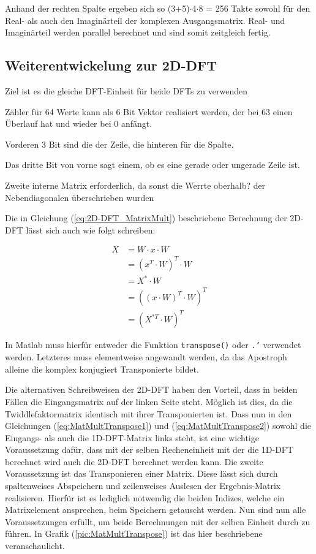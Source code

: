 Anhand der rechten Spalte ergeben sich so (3+5)$\cdot$4$\cdot$8 = 256 Takte sowohl für den Real- als auch den Imaginärteil der komplexen Ausgangsmatrix. Real- und Imaginärteil
werden parallel berechnet und sind somit zeitgleich fertig.


\subsection{Weiterentwickelung zur 2D-DFT}

Ziel ist es die gleiche DFT-Einheit für beide DFTs zu verwenden

Zähler für 64 Werte kann als 6 Bit Vektor realisiert werden, der bei 63 einen Überlauf hat und wieder bei 0 anfängt.

Vorderen 3 Bit sind die der Zeile, die hinteren für die Spalte.

Das dritte Bit von vorne sagt einem, ob es eine gerade oder ungerade Zeile ist.

Zweite interne Matrix erforderlich, da sonst die Werrte oberhalb? der
Nebendiagonalen  überschrieben wurden
 
 
 
Die in Gleichung (\ref{eq:2D-DFT_MatrixMult}) beschriebene Berechnung der 2D-DFT lässt sich auch wie folgt schreiben:

\begin{align}
 X &= W \cdot x \cdot W \nonumber \\
   &= \left(x^T\cdot W\right)^T\cdot W \label{eq:MatMultTranspose1} \\
   &= X^* \cdot W \nonumber\\
   &= \left(\left(x\cdot W\right)^T\cdot W\right)^T \label{eq:MatMultTranspose2}\\
   &= \left(X^{*T} \cdot W\right)^T \nonumber
\end{align}

In Matlab muss hierfür entweder die Funktion \texttt{transpose()} oder \texttt{.'} verwendet werden. Letzteres muss elementweise angewandt werden, da das Apostroph
alleine die komplex konjugiert Transponierte bildet.

Die alternativen Schreibweisen der 2D-DFT haben den Vorteil, dass in beiden Fällen die Eingangsmatrix auf der linken Seite steht. Möglich ist dies, da die 
Twiddlefaktormatrix identisch mit ihrer Transponierten ist.
Dass nun in den Gleichungen (\ref{eq:MatMultTranspose1}) und (\ref{eq:MatMultTranspose2}) sowohl die Eingangs- als auch die 1D-DFT-Matrix links steht, ist eine wichtige 
Voraussetzung dafür, dass mit der selben Recheneinheit mit der die 1D-DFT berechnet wird auch die 2D-DFT berechnet werden kann.
Die zweite Voraussetzung ist das Transponieren einer Matrix. Diese lässt sich durch spaltenweises Abspeichern und zeilenweises Auslesen der Ergebnis-Matrix realisieren.
Hierfür ist es lediglich notwendig die beiden Indizes, welche ein Matrixelement ansprechen, beim Speichern getauscht werden. Nun sind nun alle Voraussetzungen erfüllt, 
um beide Berechnungen mit der selben Einheit durch zu führen. In Grafik (\ref{pic:MatMultTranspose}) ist das hier beschriebene veranschaulicht.

